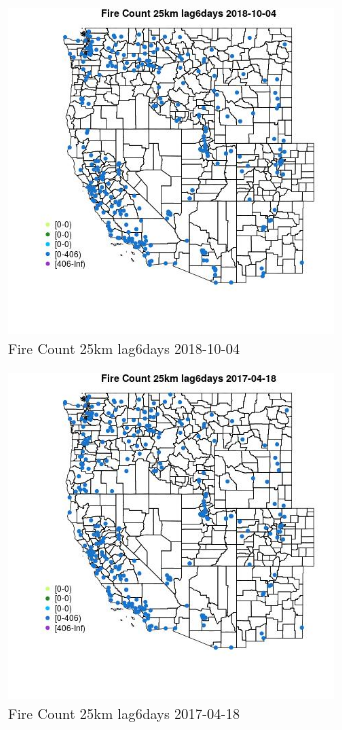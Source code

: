 \begin{figure} 
\centering  
\includegraphics[width=0.77\textwidth]{Code_Outputs/Report_ML_input_PM25_Step4_part_f_de_duplicated_aveswNAs_MapObsFire_Count_25km_lag6days2018-10-04.jpg} 
\caption{\label{fig:Report_ML_input_PM25_Step4_part_f_de_duplicated_aveswNAsMapObsFire_Count_25km_lag6days2018-10-04}Fire Count 25km lag6days 2018-10-04} 
\end{figure} 
 

\begin{figure} 
\centering  
\includegraphics[width=0.77\textwidth]{Code_Outputs/Report_ML_input_PM25_Step4_part_f_de_duplicated_aveswNAs_MapObsFire_Count_25km_lag6days2017-04-18.jpg} 
\caption{\label{fig:Report_ML_input_PM25_Step4_part_f_de_duplicated_aveswNAsMapObsFire_Count_25km_lag6days2017-04-18}Fire Count 25km lag6days 2017-04-18} 
\end{figure} 
 

